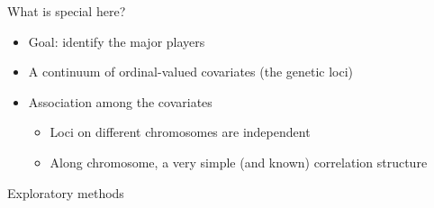\documentclass[12pt]{article}
\newcommand{\headsize}{\fontsize{35}{35} \selectfont}
\newcommand{\smallersize}{\fontsize{20}{25} \selectfont}
\newcommand{\smallestsize}{\fontsize{18}{22} \selectfont}
\begin{document}
\newpage

\headsize \color{myyellow}
\hfill \begin{minipage}{5.75in}
\centering
What is special here?
\end{minipage}

\vspace{3cm} \color{mywhite} \smallersize

\hfill \begin{minipage}{10in}
\begin{itemize}
\itemsep24pt

\item Goal: identify the major players

\item A continuum of ordinal-valued covariates (the genetic loci)

\item Association among the covariates
{\color{myblue} \smallestsize
\begin{itemize}
\item Loci on different chromosomes are independent
\item Along chromosome, a very simple (and known) correlation
  structure
\end{itemize} }

\end{itemize}
\end{minipage}





\newpage

\headsize \color{myyellow}
\hfill \begin{minipage}{5.75in}
\centering
Exploratory methods
\end{minipage}

\vspace{3cm} \color{mywhite} \smallersize
\end{document}
